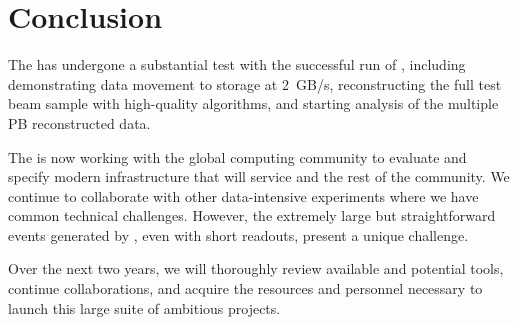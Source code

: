 \section{Conclusion}
The   has undergone a substantial test with the successful run of , including demonstrating data movement to storage at \SI{2}{GB/s}, reconstructing the full test beam sample with high-quality algorithms, and starting analysis of the multiple PB reconstructed data. 

The  is now working with the global  computing community to evaluate and specify modern infrastructure that will service  and the rest of the  community.  We continue to collaborate with other data-intensive experiments where we have common technical challenges. However, the extremely large but straightforward events generated by  , even with short readouts, present a unique challenge. 

Over the next two years, we  will thoroughly review available and potential tools, continue collaborations, and acquire the resources and personnel necessary to launch this large suite of ambitious projects. 
